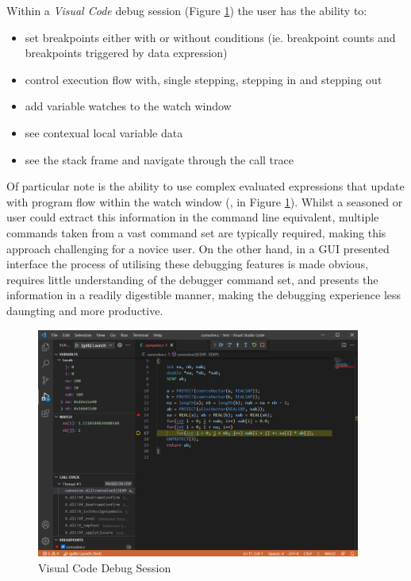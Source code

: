 Within a \emph{Visual Code} debug session (Figure \ref{fig:VisualCode}) the user has the ability to:

\begin{itemize}
\item set breakpoints either with or without conditions (ie. breakpoint counts and breakpoints triggered by data expression)
\item control execution flow with, single stepping, stepping in and stepping out
\item add variable watches to the watch window
\item see contexual local variable data
\item see the stack frame and navigate through the call trace
\end{itemize}

Of particular note is the ability to use complex evaluated expressions that update with program flow within the watch window (,  in Figure \ref{fig:VisualCode}). 
Whilst a seasoned  or  user could extract this information in the command line equivalent, multiple commands taken from a vast command set are typically required,
making this approach challenging for a novice user. On the other hand, in a GUI presented interface the process of utilising these debugging features is made obvious, 
requires little understanding of the debugger command set, and presents the information in a readily digestible manner, making the debugging experience less daungting and more productive. 

\begin{Schunk}
  \begin{figure}[h]
  {\centering \includegraphics[width=0.95\textwidth]{VisualCode} 

  }
  \caption[Visual Code Debug Session]{Visual Code Debug Session}\label{fig:VisualCode}
  \end{figure}
\end{Schunk}
  

